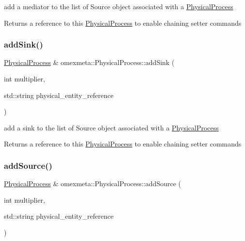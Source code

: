 add a mediator to the list of Source object associated with a \hyperlink{classomexmeta_1_1PhysicalProcess}{Physical\+Process} 

\begin{DoxyReturn}{Returns}
a reference to this \hyperlink{classomexmeta_1_1PhysicalProcess}{Physical\+Process} to enable chaining setter commands 
\end{DoxyReturn}
\mbox{\label{classomexmeta_1_1PhysicalProcess_a403ffc7d7d29702f2ff4e56084a1d714}} 
\subsubsection{\texorpdfstring{add\+Sink()}{addSink()}}
{\footnotesize\ttfamily \hyperlink{classomexmeta_1_1PhysicalProcess}{Physical\+Process} \& omexmeta\+::\+Physical\+Process\+::add\+Sink (\begin{DoxyParamCaption}\item[{int}]{multiplier,  }\item[{std\+::string}]{physical\+\_\+entity\+\_\+reference }\end{DoxyParamCaption})}



add a sink to the list of Source object associated with a \hyperlink{classomexmeta_1_1PhysicalProcess}{Physical\+Process} 

\begin{DoxyReturn}{Returns}
a reference to this \hyperlink{classomexmeta_1_1PhysicalProcess}{Physical\+Process} to enable chaining setter commands 
\end{DoxyReturn}
\mbox{\label{classomexmeta_1_1PhysicalProcess_ab83f58b7df77fdee131c22c71da22f39}} 
\subsubsection{\texorpdfstring{add\+Source()}{addSource()}}
{\footnotesize\ttfamily \hyperlink{classomexmeta_1_1PhysicalProcess}{Physical\+Process} \& omexmeta\+::\+Physical\+Process\+::add\+Source (\begin{DoxyParamCaption}\item[{int}]{multiplier,  }\item[{std\+::string}]{physical\+\_\+entity\+\_\+reference }\end{DoxyParamCaption})}



